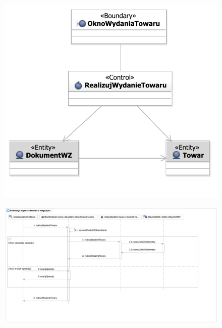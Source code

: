 \begin{figure}[H]
  \centering
  \includegraphics[angle=\ecbangle, scale=\ecbscale]{../img/usecase/pu16ecb.pdf}
  \caption{}
\end{figure}

\begin{figure}[H]
  \centering
  \includegraphics[angle=\seqangle, scale=0.5]{../img/usecase/pu16seq.pdf}
  \caption{}
\end{figure}
\newpage

